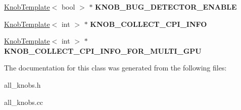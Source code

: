\begin{DoxyCompactItemize}
\item 
\hypertarget{classall__knobs__c_a473fe4619a45542253678285d0c07fc3}{
\hyperlink{classKnobTemplate}{KnobTemplate}$<$ bool $>$ $\ast$ {\bfseries KNOB\_\-BUG\_\-DETECTOR\_\-ENABLE}}
\label{classall__knobs__c_a473fe4619a45542253678285d0c07fc3}

\item 
\hypertarget{classall__knobs__c_a155de1d27fc26a4368774114b3ab3d36}{
\hyperlink{classKnobTemplate}{KnobTemplate}$<$ int $>$ $\ast$ {\bfseries KNOB\_\-COLLECT\_\-CPI\_\-INFO}}
\label{classall__knobs__c_a155de1d27fc26a4368774114b3ab3d36}

\item 
\hypertarget{classall__knobs__c_abc5c5eaf66d8bcdc6b40244b927fd1ec}{
\hyperlink{classKnobTemplate}{KnobTemplate}$<$ int $>$ $\ast$ {\bfseries KNOB\_\-COLLECT\_\-CPI\_\-INFO\_\-FOR\_\-MULTI\_\-GPU}}
\label{classall__knobs__c_abc5c5eaf66d8bcdc6b40244b927fd1ec}

\end{DoxyCompactItemize}


The documentation for this class was generated from the following files:\begin{DoxyCompactItemize}
\item 
all\_\-knobs.h\item 
all\_\-knobs.cc\end{DoxyCompactItemize}
